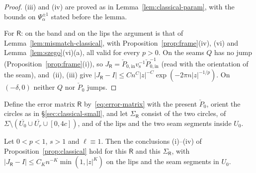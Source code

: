 \begin{proof}
(iii) and (iv) are proved as in Lemma~\ref{lem:classical-param}, with the bounds on $\Psi_\alpha^{\pm1}$ stated before the
lemma.

For $\mathsf R$: on the band and on the lips the argument is that of Lemma~\ref{lem:mismatch-classical}, with
Proposition~\ref{prop:frame}(iv), (vi) and Lemma~\ref{lem:szego}(vi)(a), all valid for every $p>0$. On the seams $Q$ has
no jump (Proposition~\ref{prop:frame}(i)), so $J_{\mathsf R}=\check P_{0,\mathrm{in}}v_{\mathrm s}^{-1}\check P_{0,\mathrm{in}}^{-1}$
(read with the orientation of the seam), and~(ii), (iii) give $|J_{\mathsf R}-I|\le Cn^C|z|^{-C}\exp(-2\pi n|z|^{-1/p})$.
On $(-\delta,0)$ neither $Q$ nor $\check P_0$ jumps.
\end{proof}

Define the error matrix $\mathsf R$ by~\eqref{eq:error-matrix} with the present $\check P_0$, orient the circles as in
\S\ref{sec:classical-small}, and let $\Sigma_{\mathsf R}$ consist of the two circles, of
$\Sigma\setminus(\overline{U_0}\cup\overline{U_r}\cup[0,4c])$, and of the lips and the two seam segments inside $U_0$.

\begin{proposition}\label{prop:plt1-small}
Let $0<p<1$, $s>1$ and $\ell\equiv1$. Then the conclusions (i)--(iv) of Proposition~\ref{prop:classical} hold for this
$\mathsf R$ and this $\Sigma_{\mathsf R}$, with $|J_{\mathsf R}-I|\le C_Kn^{-K}\min(1,|z|^K)$ on the lips and the seam
segments in $U_0$.
\end{proposition}

